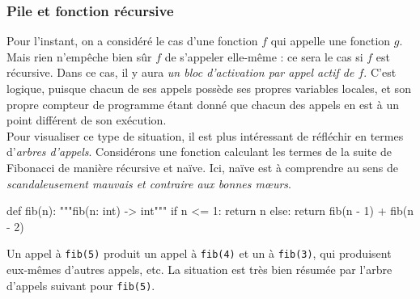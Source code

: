 \documentclass{magnolia}
\begin{document}
\subsubsection{Pile et fonction récursive}

Pour l'instant, on a considéré le cas d'une fonction $f$ qui
appelle une fonction $g$. Mais rien n'empêche bien sûr $f$
de s'appeler elle-même : ce sera le cas si $f$
est récursive. Dans ce cas, il y aura
\emph{un bloc d'activation par appel actif de $f$}.
C'est logique, puisque chacun de ses appels possède ses propres variables
locales, et son propre compteur de programme étant donné que chacun des appels en est à un
point différent de son exécution.\\

Pour visualiser ce type de situation, il est plus intéressant de réfléchir en
termes d'\emph{arbres d'appels}. Considérons une fonction calculant les termes
de la suite de Fibonacci de manière récursive et naïve. Ici, \og naïve \fg
  est à comprendre au sens de \emph{scandaleusement
    mauvais et contraire aux bonnes mœurs}.
\begin{pythoncodeline}
def fib(n):
    """fib(n: int) -> int"""
    if n <= 1:
        return n
    else:
        return fib(n - 1) + fib(n - 2)
\end{pythoncodeline}
Un appel à \verb!fib(5)! produit un appel à \verb!fib(4)! et un à \verb!fib(3)!,
qui produisent eux-mêmes d'autres appels, etc. La situation est très bien
résumée par l'arbre d'appels suivant pour \verb!fib(5)!.
\begin{center}
\end{center}
\end{document}
